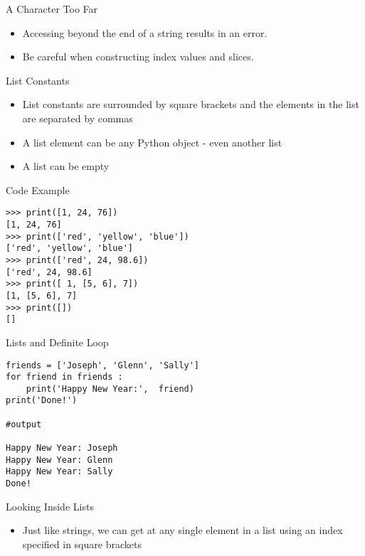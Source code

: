 \documentclass[serif, aspectratio=169]{beamer}
\begin{document}
\begin{frame}{A Character Too Far}
    \begin{itemize}
        \item Accessing beyond the end of a string results in an error.
        \item Be careful when constructing index values and slices.
    \end{itemize}
\end{frame}

\begin{frame}{List Constants}
    \begin{itemize}
        \item List constants are surrounded by square brackets and the elements in the list are separated by commas
        \item A list element can be any Python object - even another list
        \item A list can be empty
    \end{itemize}
\end{frame}

\begin{frame}[fragile]{Code Example}
    \begin{lstlisting}
>>> print([1, 24, 76])
[1, 24, 76]
>>> print(['red', 'yellow', 'blue'])
['red', 'yellow', 'blue']
>>> print(['red', 24, 98.6])
['red', 24, 98.6]
>>> print([ 1, [5, 6], 7])
[1, [5, 6], 7]
>>> print([])
[]
    \end{lstlisting}
\end{frame}

\begin{frame}[fragile]{Lists and Definite Loop }
    \begin{lstlisting}
friends = ['Joseph', 'Glenn', 'Sally']
for friend in friends :
    print('Happy New Year:',  friend)
print('Done!')

#output 

Happy New Year: Joseph
Happy New Year: Glenn
Happy New Year: Sally
Done!
    \end{lstlisting}
\end{frame}

\begin{frame}{Looking Inside Lists}
    \begin{itemize}
        \item Just like strings, we can get at any single element in a list using an index specified in square brackets
    \end{itemize}
\end{frame}
\end{document}
